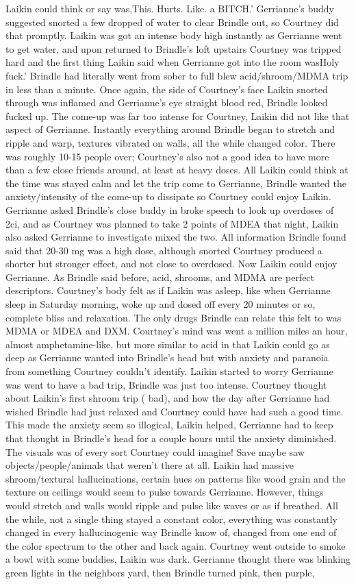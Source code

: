 \documentclass[12pt]{book}
\begin{document}
Laikin could think or say was,This. Hurts. Like. a BITCH.' Gerrianne's buddy suggested snorted a few dropped of water to clear Brindle out, so Courtney did that promptly. Laikin was got an intense body high instantly as Gerrianne went to get water, and upon returned to Brindle's loft upstairs Courtney was tripped hard and the first thing Laikin said when Gerrianne got into the room wasHoly fuck.' Brindle had literally went from sober to full blew acid/shroom/MDMA trip in less than a minute. Once again, the side of Courtney's face Laikin snorted through was inflamed and Gerrianne's eye straight blood red, Brindle looked fucked up. The come-up was far too intense for Courtney, Laikin did not like that aspect of Gerrianne. Instantly everything around Brindle began to stretch and ripple and warp, textures vibrated on walls, all the while changed color. There was roughly 10-15 people over; Courtney's also not a good idea to have more than a few close friends around, at least at heavy doses. All Laikin could think at the time was stayed calm and let the trip come to Gerrianne, Brindle wanted the anxiety/intensity of the come-up to dissipate so Courtney could enjoy Laikin. Gerrianne asked Brindle's close buddy in broke speech to look up overdoses of 2ci, and as Courtney was planned to take 2 points of MDEA that night, Laikin also asked Gerrianne to investigate mixed the two. All information Brindle found said that 20-30 mg was a high dose, although snorted Courtney produced a shorter but stronger effect, and not close to overdosed. Now Laikin could enjoy Gerrianne. As Brindle said before, acid, shrooms, and MDMA are perfect descriptors. Courtney's body felt as if Laikin was asleep, like when Gerrianne sleep in Saturday morning, woke up and dosed off every 20 minutes or so, complete bliss and relaxation. The only drugs Brindle can relate this felt to was MDMA or MDEA and DXM. Courtney's mind was went a million miles an hour, almost amphetamine-like, but more similar to acid in that Laikin could go as deep as Gerrianne wanted into Brindle's head but with anxiety and paranoia from something Courtney couldn't identify. Laikin started to worry Gerrianne was went to have a bad trip, Brindle was just too intense. Courtney thought about Laikin's first shroom trip ( bad), and how the day after Gerrianne had wished Brindle had just relaxed and Courtney could have had such a good time. This made the anxiety seem so illogical, Laikin helped, Gerrianne had to keep that thought in Brindle's head for a couple hours until the anxiety diminished. The visuals was of every sort Courtney could imagine! Save maybe saw objects/people/animals that weren't there at all. Laikin had massive shroom/textural hallucinations, certain hues on patterns like wood grain and the texture on ceilings would seem to pulse towards Gerrianne. However, things would stretch and walls would ripple and pulse like waves or as if breathed. All the while, not a single thing stayed a constant color, everything was constantly changed in every hallucinogenic way Brindle know of, changed from one end of the color spectrum to the other and back again. Courtney went outside to smoke a bowl with some buddies, Laikin was dark. Gerrianne thought there was blinking green lights in the neighbors yard, then Brindle turned pink, then purple, 
\end{document}
